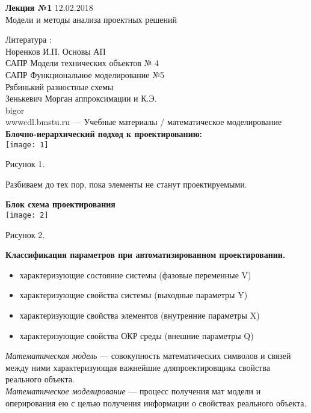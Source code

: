 \LARGE{ \textbf {Лекция №1} 12.02.2018 }\\
\Large Модели и методы анализа проектных решений

Литература :\\
Норенков И.П. Основы АП\\
САПР Модели технических объектов № 4\\
САПР Функциональное моделирование №5\\
Рябинький разностные схемы\\
Зенькевич Морган аппроксимации и К.Э.\\
bigor\\
wwwcdl.bmstu.ru --- Учебные материалы / математическое моделирование\\

\textbf {Блочно-иерархический подход к проектированию:} \\
\texttt{[image: 1]}
\begin{center}
  Рисунок 1.\\
\end{center}
Разбиваем до тех пор, пока элементы не станут проектируемыми.\\

\newpage

\textbf {Блок схема проектирования} \\
\texttt{[image: 2]}
\begin{center}
  Рисунок 2.\\
\end{center}

{\bfseries Классификация параметров при автоматизированном проектировании.}
\begin{itemize}
  \item  характеризующие состояние системы (фазовые переменные V)
  \item  характеризующие свойства системы (выходные параметры Y)
  \item  характеризующие свойства элементов (внутренние параметры X)
  \item  характеризующие свойства ОКР среды (внешние параметры Q)
\end{itemize}
{\itshape Математическая модель} — совокупность математических символов и связей между ними характеризующая важнейшие дляпроектировщика свойства реального объекта.\\
{\itshape Математическое моделирование} — процесс получения мат модели и оперирования ею с целью получения информации о свойствах реального объекта.\\

